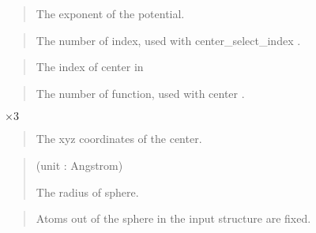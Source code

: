 \documentclass[a4paper,11pt,oneside,english]{sphinxmanual}
\begin{document}
 
\begin{quote}


The exponent of the potential.
\end{quote}

 
\begin{quote}


The number of index, used with center\_select\_index .
\end{quote}

  
\begin{quote}


The index of center in \sphinxstylestrong{{[}SELECTION{]}}
\end{quote}

 
\begin{quote}


The number of function, used with center .
\end{quote}

   \(\times 3\)
\begin{quote}


The xyz coordinates of the center.
\end{quote}

 
\begin{quote}

 (unit : Angstrom)

The radius of sphere.
\end{quote}

 
\begin{quote}


Atoms out of the sphere in the input structure are fixed.
\end{quote}
\end{document}
